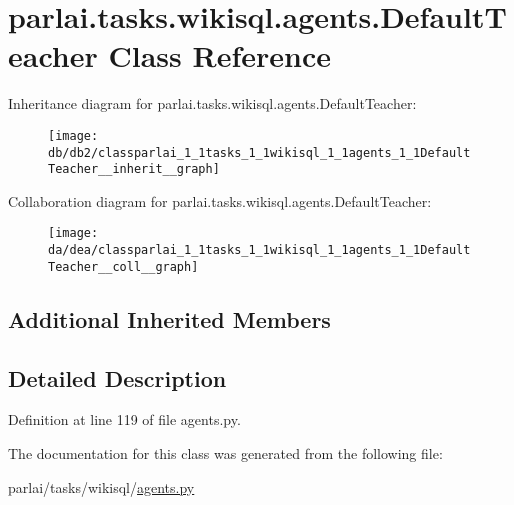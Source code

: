\hypertarget{classparlai_1_1tasks_1_1wikisql_1_1agents_1_1DefaultTeacher}{}\section{parlai.\+tasks.\+wikisql.\+agents.\+Default\+Teacher Class Reference}
\label{classparlai_1_1tasks_1_1wikisql_1_1agents_1_1DefaultTeacher}


Inheritance diagram for parlai.\+tasks.\+wikisql.\+agents.\+Default\+Teacher\+:
\nopagebreak
\begin{figure}[H]
\begin{center}
\leavevmode
\texttt{[image: db/db2/classparlai\_1\_1tasks\_1\_1wikisql\_1\_1agents\_1\_1DefaultTeacher\_\_inherit\_\_graph]}
\end{center}
\end{figure}


Collaboration diagram for parlai.\+tasks.\+wikisql.\+agents.\+Default\+Teacher\+:
\nopagebreak
\begin{figure}[H]
\begin{center}
\leavevmode
\texttt{[image: da/dea/classparlai\_1\_1tasks\_1\_1wikisql\_1\_1agents\_1\_1DefaultTeacher\_\_coll\_\_graph]}
\end{center}
\end{figure}
\subsection*{Additional Inherited Members}


\subsection{Detailed Description}


Definition at line 119 of file agents.\+py.



The documentation for this class was generated from the following file\+:\begin{DoxyCompactItemize}
\item 
parlai/tasks/wikisql/\hyperlink{parlai_2tasks_2wikisql_2agents_8py}{agents.\+py}\end{DoxyCompactItemize}
